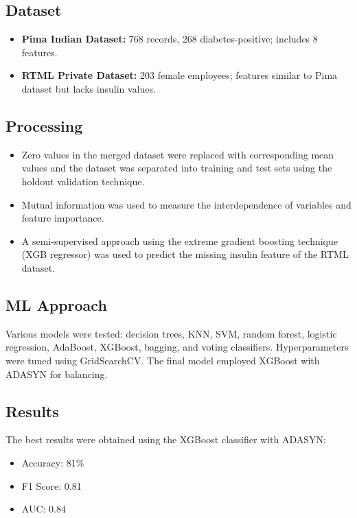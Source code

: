 \subsection*{Dataset}
\begin{itemize}
    \item \textbf{Pima Indian Dataset:} 768 records, 268 diabetes-positive; includes 8 features.
    \item \textbf{RTML Private Dataset:} 203 female employees; features similar to Pima dataset but lacks insulin values.
\end{itemize}

\subsection*{Processing}
\begin{itemize}
    \item Zero values in the merged dataset were replaced with corresponding mean values and the dataset was separated into training and test sets using the holdout validation technique.
    \item Mutual information was used to measure the interdependence of variables and feature importance.
    \item A semi-supervised approach using the extreme gradient boosting technique (XGB regressor) was used to predict the missing insulin feature of the RTML dataset.
\end{itemize}

\subsection*{ML Approach}
Various models were tested: decision trees, KNN, SVM, random forest, logistic regression, AdaBoost, XGBoost, bagging, and voting classifiers. Hyperparameters were tuned using GridSearchCV. The final model employed XGBoost with ADASYN for balancing.

\subsection*{Results}
The best results were obtained using the XGBoost classifier with ADASYN:
\begin{itemize}
    \item Accuracy: 81\%
    \item F1 Score: 0.81
    \item AUC: 0.84
\end{itemize}

